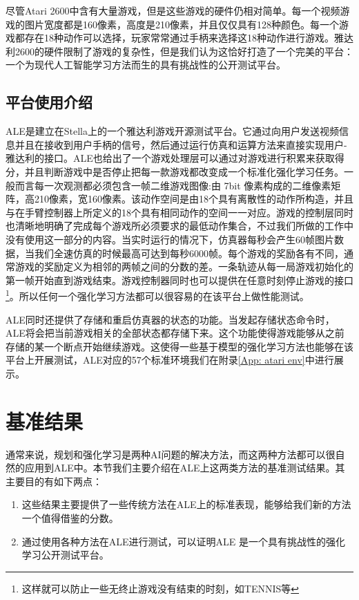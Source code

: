 尽管Atari 2600中含有大量游戏，但是这些游戏的硬件仍相对简单。每一个视频游戏的图片宽度都是160像素，高度是210像素，并且仅仅具有128种颜色。每一个游戏都存在18种动作可以选择，玩家常常通过手柄来选择这18种动作进行游戏。雅达利2600的硬件限制了游戏的复杂性，但是我们认为这恰好打造了一个完美的平台：一个为现代人工智能学习方法而生的具有挑战性的公开测试平台。

\subsection{平台使用介绍}
ALE是建立在Stella上的一个雅达利游戏开源测试平台。它通过向用户发送视频信息并且在接收到用户手柄的信号，然后通过运行仿真和运算方法来直接实现用户-雅达利的接口。ALE也给出了一个游戏处理层可以通过对游戏进行积累来获取得分，并且判断游戏中是否停止把每一款游戏都改变成一个标准化强化学习任务。一般而言每一次观测都必须包含一帧二维游戏图像:由 7bit 像素构成的二维像素矩阵，高210像素，宽160像素。该动作空间是由18个具有离散性的动作所构造，并且与在手臂控制器上所定义的18个具有相同动作的空间一一对应。游戏的控制层同时也清晰地明确了完成每个游戏所必须要求的最低动作集合，不过我们所做的工作中没有使用这一部分的内容。当实时运行的情况下，仿真器每秒会产生60帧图片数据，当我们全速仿真的时候最高可达到每秒6000帧。每个游戏的奖励各有不同，通常游戏的奖励定义为相邻的两帧之间的分数的差。一条轨迹从每一局游戏初始化的第一帧开始直到游戏结束。游戏控制器同时也可以提供在任意时刻停止游戏的接口\footnote{这样就可以防止一些无终止游戏没有结束的时刻，如TENNIS等}。所以任何一个强化学习方法都可以很容易的在该平台上做性能测试。

ALE同时还提供了存储和重启仿真器的状态的功能。当发起存储状态命令时，ALE将会把当前游戏相关的全部状态都存储下来。这个功能使得游戏能够从之前存储的某一个断点开始继续游戏。这使得一些基于模型的强化学习方法也能够在该平台上开展测试，ALE对应的57个标准环境我们在附录\ref{App: atari env}中进行展示。



\section{基准结果}

通常来说，规划和强化学习是两种AI问题的解决方法，而这两种方法都可以很自然的应用到ALE中。本节我们主要介绍在ALE上这两类方法的基准测试结果。其主要目的有如下两点：
\begin{enumerate}
    \item 这些结果主要提供了一些传统方法在ALE上的标准表现，能够给我们新的方法一个值得借鉴的分数。
    \item 通过使用各种方法在ALE进行测试，可以证明ALE 是一个具有挑战性的强化学习公开测试平台。
\end{enumerate}


